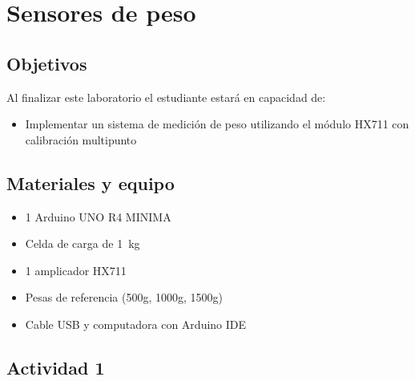 \documentclass[12pt,letterpaper]{report}
\newcommand{\obj}{Objetivos}
\newcommand{\mat}{Materiales y equipo}
\newcommand{\capacidad}{Al finalizar este laboratorio el estudiante estará en capacidad de:}
\begin{document}
\chapter{Sensores de peso}
\section{\obj}
\capacidad
\begin{itemize}
\item Implementar un sistema de medición de peso utilizando el módulo HX711 con calibración multipunto
\end{itemize}

\section{\mat}
\begin{itemize}
\item 1 Arduino UNO R4 MINIMA
\item Celda de carga de \SI{1}{\kilogram}
\item 1 amplicador HX711
\item Pesas de referencia (500g, 1000g, 1500g)
\item Cable USB y computadora con Arduino IDE
\end{itemize}

\section{Actividad 1}
\end{document}
